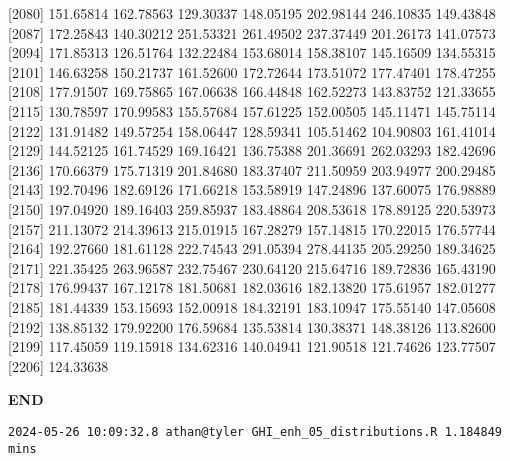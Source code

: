 \documentclass[
  10pt,
  a4paper,oneside]{article}
\begin{document}
{[}2080{]} 151.65814 162.78563 129.30337 148.05195 202.98144 246.10835 149.43848
{[}2087{]} 172.25843 140.30212 251.53321 261.49502 237.37449 201.26173 141.07573
{[}2094{]} 171.85313 126.51764 132.22484 153.68014 158.38107 145.16509 134.55315
{[}2101{]} 146.63258 150.21737 161.52600 172.72644 173.51072 177.47401 178.47255
{[}2108{]} 177.91507 169.75865 167.06638 166.44848 162.52273 143.83752 121.33655
{[}2115{]} 130.78597 170.99583 155.57684 157.61225 152.00505 145.11471 145.75114
{[}2122{]} 131.91482 149.57254 158.06447 128.59341 105.51462 104.90803 161.41014
{[}2129{]} 144.52125 161.74529 169.16421 136.75388 201.36691 262.03293 182.42696
{[}2136{]} 170.66379 175.71319 201.84680 183.37407 211.50959 203.94977 200.29485
{[}2143{]} 192.70496 182.69126 171.66218 153.58919 147.24896 137.60075 176.98889
{[}2150{]} 197.04920 189.16403 259.85937 183.48864 208.53618 178.89125 220.53973
{[}2157{]} 211.13072 214.39613 215.01915 167.28279 157.14815 170.22015 176.57744
{[}2164{]} 192.27660 181.61128 222.74543 291.05394 278.44135 205.29250 189.34625
{[}2171{]} 221.35425 263.96587 232.75467 230.64120 215.64716 189.72836 165.43190
{[}2178{]} 176.99437 167.12178 181.50681 182.03616 182.13820 175.61957 182.01277
{[}2185{]} 181.44339 153.15693 152.00918 184.32191 183.10947 175.55140 147.05608
{[}2192{]} 138.85132 179.92200 176.59684 135.53814 130.38371 148.38126 113.82600
{[}2199{]} 117.45059 119.15918 134.62316 140.04941 121.90518 121.74626 123.77507
{[}2206{]} 124.33638

\textbf{END}

\begin{verbatim}
2024-05-26 10:09:32.8 athan@tyler GHI_enh_05_distributions.R 1.184849 mins
\end{verbatim}
\end{document}

